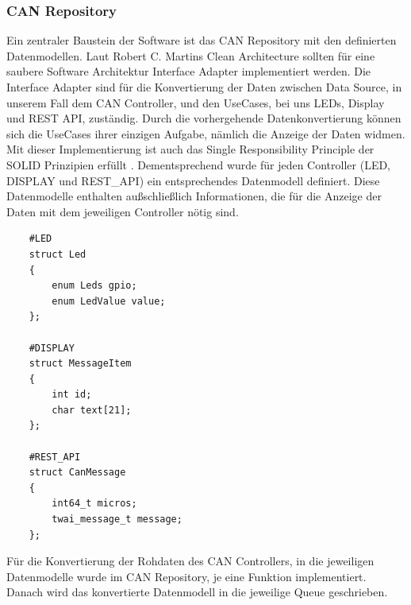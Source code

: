 \subsubsection{CAN Repository}
Ein zentraler Baustein der Software ist das CAN Repository mit den definierten Datenmodellen. Laut Robert C. Martins Clean Architecture \cite{martin_robert_c_clean_2012} sollten für eine saubere Software Architektur Interface Adapter implementiert werden. Die Interface Adapter sind für die Konvertierung der Daten zwischen Data Source, in unserem Fall dem CAN Controller, und den UseCases, bei uns LEDs, Display und REST API, zuständig. Durch die vorhergehende Datenkonvertierung können sich die UseCases ihrer einzigen Aufgabe, nämlich die Anzeige der Daten widmen. Mit dieser Implementierung ist auch das Single Responsibility Principle der SOLID Prinzipien erfüllt \cite{martin_robert_c_solid_2020}. Dementsprechend wurde für jeden Controller (LED, DISPLAY und REST\_API) ein entsprechendes Datenmodell definiert. Diese Datenmodelle enthalten außschließlich Informationen, die für die Anzeige der Daten mit dem jeweiligen Controller nötig sind.
\begin{lstlisting}
    #LED
    struct Led
    {
        enum Leds gpio;
        enum LedValue value;
    };
    
    #DISPLAY
    struct MessageItem
    {
        int id;
        char text[21];
    };
    
    #REST_API
    struct CanMessage
    {
        int64_t micros;
        twai_message_t message;
    };
\end{lstlisting}
Für die Konvertierung der Rohdaten des CAN Controllers, in die jeweiligen Datenmodelle wurde im CAN Repository, je eine Funktion implementiert. Danach wird das konvertierte Datenmodell in die jeweilige Queue geschrieben.
